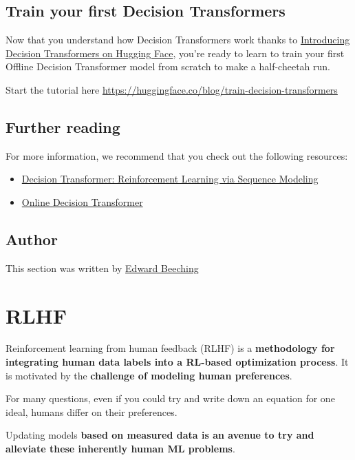 \documentclass[11pt,a4paper]{article}
\begin{document}
\subsection{Train your first Decision Transformers}\label{train-your-first-decision-transformers}

Now that you understand how Decision Transformers work thanks to \href{https://huggingface.co/blog/decision-transformers}{Introducing Decision Transformers on Hugging Face}, you're ready to learn to train your first Offline Decision Transformer model from scratch to make a half-cheetah run.

Start the tutorial here \url{https://huggingface.co/blog/train-decision-transformers}

\subsection{Further reading}\label{further-reading-3}

For more information, we recommend that you check out the following resources:

\begin{itemize}
\item
  \href{https://arxiv.org/abs/2106.01345}{Decision Transformer: Reinforcement Learning via Sequence Modeling}
\item
  \href{https://arxiv.org/abs/2202.05607}{Online Decision Transformer}
\end{itemize}

\subsection{Author}\label{author-3}

This section was written by \href{https://twitter.com/edwardbeeching}{Edward Beeching}

\section{RLHF}\label{rlhf}

Reinforcement learning from human feedback (RLHF) is a \textbf{methodology for integrating human data labels into a RL-based optimization process}. It is motivated by the \textbf{challenge of modeling human preferences}.

For many questions, even if you could try and write down an equation for one ideal, humans differ on their preferences.

Updating models \textbf{based on measured data is an avenue to try and alleviate these inherently human ML problems}.
\end{document}
